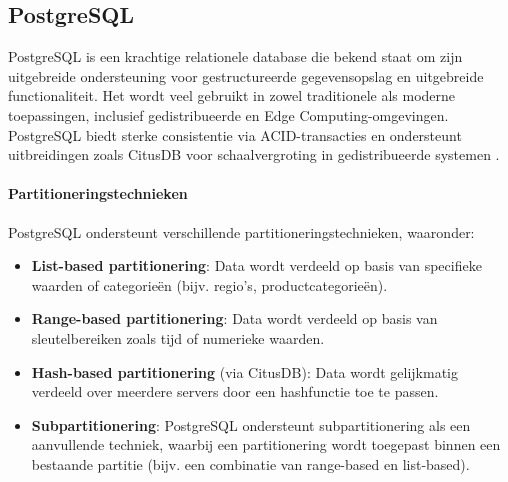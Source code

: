 \subsection{PostgreSQL}

PostgreSQL is een krachtige relationele database die bekend staat om zijn uitgebreide ondersteuning voor gestructureerde gegevensopslag en uitgebreide functionaliteit. Het wordt veel gebruikt in zowel traditionele als moderne toepassingen, inclusief gedistribueerde en Edge Computing-omgevingen. PostgreSQL biedt sterke consistentie via ACID-transacties en ondersteunt uitbreidingen zoals CitusDB voor schaalvergroting in gedistribueerde systemen \autocite{Kleppmann2017, PostgreSQLDocumentation}.

\paragraph{Partitioneringstechnieken}  
PostgreSQL ondersteunt verschillende partitioneringstechnieken, waaronder:
\begin{itemize}
    \item \textbf{List-based partitionering}: Data wordt verdeeld op basis van specifieke waarden of categorieën (bijv. regio's, productcategorieën).
    \item \textbf{Range-based partitionering}: Data wordt verdeeld op basis van sleutelbereiken zoals tijd of numerieke waarden.
    \item \textbf{Hash-based partitionering} (via CitusDB): Data wordt gelijkmatig verdeeld over meerdere servers door een hashfunctie toe te passen.
    \item \textbf{Subpartitionering}: PostgreSQL ondersteunt subpartitionering als een aanvullende techniek, waarbij een partitionering wordt toegepast binnen een bestaande partitie (bijv. een combinatie van range-based en list-based).
\end{itemize}

